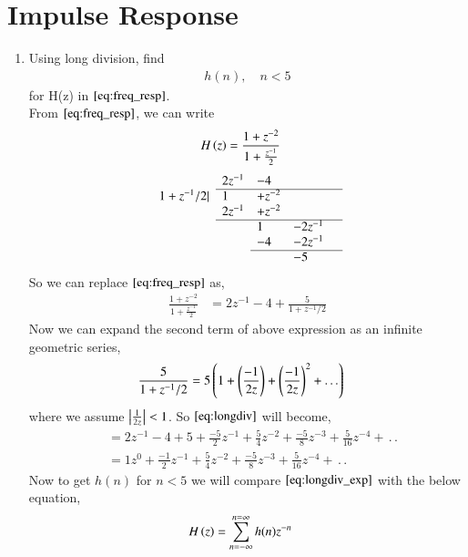 \documentclass[journal,12pt,twocolumn]{IEEEtran}
\renewcommand\thesection{\arabic{section}}
\begin{document}
\section{Impulse Response}
  \begin{enumerate}[label=\thesection.\arabic*]
    \item Using long division, 
find
		\begin{align}
			h(n), \quad n < 5
		\end{align}
		for H(z) in 
		$\eqref{eq:freq_resp}$.\\
    \solution From $\eqref{eq:freq_resp}$, we can write
	  \begin{align}
		H\left(z\right) &= \frac{1 + z^{-2}}{1 + \frac{z^{-1}}{2}}
	  \end{align}
    $$
\begin{array}{llllll}
& 2z^{-1} & -4 \\\cline{2-5}
1 + z^{-1}/2 | & 1& +z^{-2}  \\
& 2z^{-1} & +z^{-2}  \\\cline{2-5}
& & 1 & -2z^{-1} \\
& & -4 & -2z^{-1} & \\\cline{3-5}
& & & -5 \\
\end{array}
$$
So we can replace $\eqref{eq:freq_resp}$ as, 
   \begin{align}
     \frac{1+z^{-2}}{1 + \frac{z^{-1}}{2}} &= 2z^{-1} - 4 + \frac{5}{1 + z^{-1}/2}\label{eq:longdiv}
   \end{align}
   Now we can expand the second term of above expression as an infinite geometric series,
   \begin{align}
     \frac{5}{1+z^{-1}/2} &= 5\left(1 + \left(\frac{-1}{2z}\right) + \left(\frac{-1}{2z}\right)^2 + .\,.\,.\right) \end{align}
     where we assume $\left\vert\frac{1}{2z}\right\vert < 1$.
    So $\eqref{eq:longdiv}$ will become,
    \begin{align}
      &= 2z^{-1} - 4 + 5 + \frac{-5}{2}z^{-1} + \frac{5}{4}z^{-2} + \frac{-5}{8}z^{-3} + \frac{5}{16}z^{-4} + \,.\,.\\
      &= 1z^{0} + \frac{-1}{2}z^{-1} +\frac{5}{4}z^{-2} + \frac{-5}{8}z^{-3} +\frac{5}{16}z^{-4} + \,.\,.  \label{eq:longdiv_exp}
    \end{align}
   Now to get $h(n)$ for $n <5$ we will compare $\eqref{eq:longdiv_exp}$ with the below equation,
    \begin{align}
      H\left(z\right) &= \sum_{n = -\infty}^{n = \infty}h(n)z^{-n}
    \end{align}

\end{enumerate}
\end{document}

